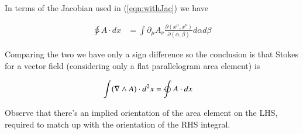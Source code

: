 In terms of the Jacobian used in (\ref{eqn:withJac}) we have

\begin{align*}
\ointctrclockwise 
A \cdot dx &= \int \partial_\mu A_\nu \frac{\partial (x^\mu, x^\nu)}{\partial (\alpha, \beta)} d\alpha d\beta
\end{align*}

Comparing the two we have only a sign difference so the conclusion is that Stokes for a vector field (considering only a flat parallelogram area element) is

\begin{align}
\int ( \grad \wedge A ) \cdot d^2 x &= \ointclockwise A \cdot dx
\end{align}

Observe that there's an implied orientation of the area element on the LHS, required to match up with the orientation of the RHS integral.

\EndArticle

